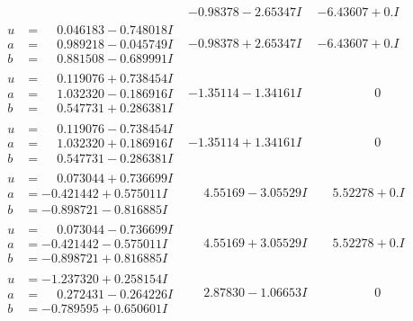 \documentclass[1p]{elsarticle_modified}
\theoremstyle{definition}
\begin{document}
$$\begin{array}{c|c|c}
 & -0.98378 - 2.65347 I & -6.43607 + 0. I\phantom{ +0.000000I} \\ \hline\begin{aligned}
u &= \phantom{-}0.046183 - 0.748018 I \\
a &= \phantom{-}0.989218 - 0.045749 I \\
b &= \phantom{-}0.881508 - 0.689991 I\end{aligned}
 & -0.98378 + 2.65347 I & -6.43607 + 0. I\phantom{ +0.000000I} \\ \hline\begin{aligned}
u &= \phantom{-}0.119076 + 0.738454 I \\
a &= \phantom{-}1.032320 - 0.186916 I \\
b &= \phantom{-}0.547731 + 0.286381 I\end{aligned}
 & -1.35114 - 1.34161 I & \phantom{-0.000000 } 0 \\ \hline\begin{aligned}
u &= \phantom{-}0.119076 - 0.738454 I \\
a &= \phantom{-}1.032320 + 0.186916 I \\
b &= \phantom{-}0.547731 - 0.286381 I\end{aligned}
 & -1.35114 + 1.34161 I & \phantom{-0.000000 } 0 \\ \hline\begin{aligned}
u &= \phantom{-}0.073044 + 0.736699 I \\
a &= -0.421442 + 0.575011 I \\
b &= -0.898721 - 0.816885 I\end{aligned}
 & \phantom{-}4.55169 - 3.05529 I & \phantom{-}5.52278 + 0. I\phantom{ +0.000000I} \\ \hline\begin{aligned}
u &= \phantom{-}0.073044 - 0.736699 I \\
a &= -0.421442 - 0.575011 I \\
b &= -0.898721 + 0.816885 I\end{aligned}
 & \phantom{-}4.55169 + 3.05529 I & \phantom{-}5.52278 + 0. I\phantom{ +0.000000I} \\ \hline\begin{aligned}
u &= -1.237320 + 0.258154 I \\
a &= \phantom{-}0.272431 - 0.264226 I \\
b &= -0.789595 + 0.650601 I\end{aligned}
 & \phantom{-}2.87830 - 1.06653 I & \phantom{-0.000000 } 0 \\ \hline\begin{aligned}

\end{aligned}
\end{array}$$
\end{document}
